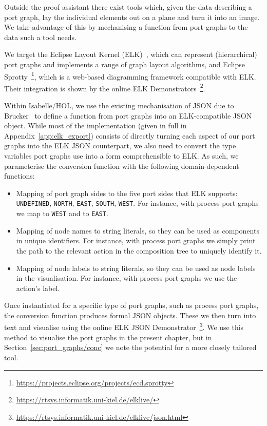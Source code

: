 \documentclass[class=smolathesis,crop=false]{standalone}
\begin{document}
Outside the proof assistant there exist tools which, given the data describing a port graph, lay the individual elements out on a plane and turn it into an image.
We take advantage of this by mechanising a function from port graphs to the data such a tool needs.

We target the Eclipse Layout Kernel (ELK)~\cite{domros_et_al-2023}, which can represent (hierarchical) port graphs and implements a range of graph layout algorithms, and Eclipse Sprotty~\footnote{\url{https://projects.eclipse.org/projects/ecd.sprotty}}, which is a web-based diagramming framework compatible with ELK.
Their integration is shown by the online ELK Demonstrators~\footnote{\url{https://rtsys.informatik.uni-kiel.de/elklive/}}.

Within Isabelle/HOL, we use the existing mechanisation of JSON due to Brucker~\cite{Nano_JSON-AFP} to define a function from port graphs into an ELK-compatible JSON object.
While most of the implementation (given in full in Appendix~\ref{app:elk_export}) consists of directly turning each aspect of our port graphs into the ELK JSON counterpart, we also need to convert the type variables port graphs use into a form comprehensible to ELK.
As such, we parameterise the conversion function with the following domain-dependent functions:
\begin{itemize}
  \item Mapping of port graph sides to the five port sides that ELK supports: \texttt{UNDEFINED}, \texttt{NORTH}, \texttt{EAST}, \texttt{SOUTH}, \texttt{WEST}.
    For instance, with process port graphs we map  to \texttt{WEST} and  to \texttt{EAST}.
  \item Mapping of node names to string literals, so they can be used as components in unique identifiers.
    For instance, with process port graphs we simply print the path to the relevant action in the composition tree to uniquely identify it.
  \item Mapping of node labels to string literals, so they can be used as node labels in the visualisation.
    For instance, with process port graphs we use the action's label.
\end{itemize}

Once instantiated for a specific type of port graphs, such as process port graphs, the conversion function produces formal JSON objects.
These we then turn into text and visualise using the online ELK JSON Demonstrator~\footnote{\url{https://rtsys.informatik.uni-kiel.de/elklive/json.html}}.
We use this method to visualise the port graphs in the present chapter, but in Section~\ref{sec:port_graphs/conc} we note the potential for a more closely tailored tool.
\end{document}
